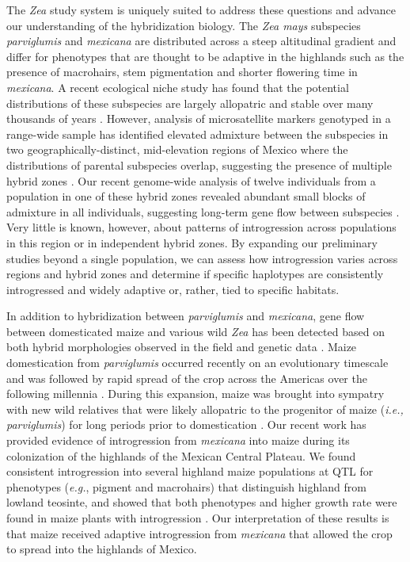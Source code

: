 The \emph{Zea} study system is uniquely suited to address these questions and advance our understanding of the hybridization biology.
The \emph {Zea mays} subspecies \emph{parviglumis} and \emph{mexicana} are distributed across a steep altitudinal gradient and differ for phenotypes that are thought to be adaptive in the highlands such as the presence of macrohairs, stem pigmentation and shorter flowering time in \emph{mexicana}.
A recent ecological niche study has found that the potential distributions of these subspecies are largely allopatric and stable over many thousands of years \citep{hufford2012inferences}.
However, analysis of microsatellite markers genotyped in a range-wide sample has identified elevated admixture between the subspecies in two geographically-distinct, mid-elevation regions of Mexico where the distributions of parental subspecies overlap, suggesting the presence of multiple hybrid zones \citep{Fukunaga2005}.  
Our recent genome-wide analysis of twelve individuals from a population in one of these hybrid zones revealed abundant small blocks of admixture in all individuals, suggesting long-term gene flow between subspecies \citep{Pyhajarvi2013}.  
Very little is known, however, about patterns of introgression across populations in this region or in independent hybrid zones.
By expanding our preliminary studies beyond a single population, we can assess how introgression varies across regions and hybrid zones and determine if specific haplotypes are consistently introgressed and widely adaptive or, rather, tied to specific habitats. 

In addition to hybridization between \emph{parviglumis} and \emph{mexicana}, gene flow between domesticated maize and various wild \emph{Zea} has been detected based on both hybrid morphologies observed in the field \citep{wilkes1967teosinte, Wilkes1977} and genetic data \citep{Fukunaga2005,Ross-Ibarra2009a,vanheerwaarden2011a}. 
Maize domestication from \emph{parviglumis} occurred recently on an evolutionary timescale \citep[$\sim$9,000BP;][]{Matsuoka2002} and was followed by rapid spread of the crop across the Americas over the following millennia \citep{Piperno2001,Grobman2012}. 
During this expansion, maize was brought into sympatry with new wild relatives that were likely allopatric to the progenitor of maize (\emph{i.e., parviglumis}) for long periods prior to domestication \citep{hufford2012inferences}. 
Our recent work has provided evidence of introgression from \emph{mexicana} into maize during its colonization of the highlands of the Mexican Central Plateau.  
We found consistent introgression into several highland maize populations at QTL for phenotypes (\emph{e.g.}, pigment and macrohairs) that distinguish highland \zm{} from lowland \zp{} teosinte, and showed that both \zm{} phenotypes and higher growth rate were found in maize plants with \zm{}  introgression \citep{Hufford2013}.
Our interpretation of these results is that maize received adaptive introgression from \emph{mexicana} that allowed the crop to spread into the highlands of Mexico.  

